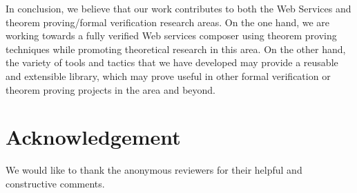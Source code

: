 \documentclass[copyright,creativecommons]{eptcs}
\begin{document}
In conclusion, we believe that our work contributes to both the Web Services and theorem proving/formal verification research areas. On the one hand, we are working towards a fully verified Web services composer using theorem proving techniques while promoting theoretical research in this area. On the other hand, the variety of tools and tactics that we have developed may provide a reusable and extensible library, which may prove useful in other formal verification or theorem proving projects in the area and beyond.

\section{Acknowledgement}

We would like to thank the anonymous reviewers for their helpful and constructive comments.




\end{document}
